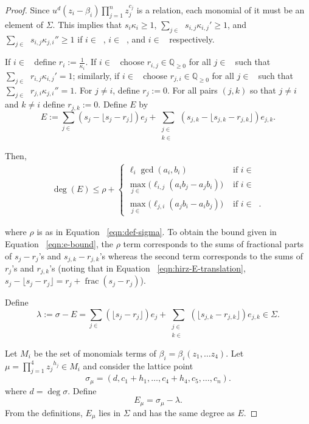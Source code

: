 \documentclass{amsart}
\theoremstyle{plain}
\theoremstyle{definition}
\theoremstyle{remark}
\numberwithin{equation}{section}
\newcommand\bq{{\mathbb Q}}
\newcommand\bida{a}
\newcommand\bidb{b}
\DeclareMathOperator{\fr}{frac}
\DeclareMathOperator{\Te}{T_=}
\DeclareMathOperator{\Tp}{T_+}
\DeclareMathOperator{\Tm}{T_-}
\begin{document}
\begin{proof}
Since $u^d (z_i - \beta_i)\prod_{j=1}^n z_j^{c_j}$ is a relation, each monomial of it must be an element of $\Sigma$. This implies that $s_i\kappa_i\ge 1$, $\sum_{j\in \Tm} s_{i,j}\kappa_{i,j}' \ge 1$, and $\sum_{j\in \Tp} s_{i,j}\kappa_{j,i}'' \ge 1$ if $i\in \Te$, $i\in \Tp$, and $i\in \Tm$ respectively.

If $i\in \Te$ define $r_i := \frac{1}{\kappa_i}$.  If $i\in \Tp$ choose $r_{i,j}\in \bq_{\ge 0}$ for all $j\in \Tm$ such that $\sum_{j\in \Tm} r_{i,j}\kappa_{i,j}' = 1$; similarly, if $i\in \Tm$ choose $r_{j,i}\in \bq_{\ge 0}$ for all $j\in \Tp$ such that $\sum_{j\in \Tm} r_{j,i}\kappa_{j,i}'' = 1$.  For $j\ne i$, define $r_j := 0.$ For all pairs $(j,k)$ so that $j \neq i$ and $k \neq i$ define $r_{j,k} := 0$.
Define $E$ by
\begin{equation}\label{eqn:hirz-E-translation}
	E := \sum_{j\in \Te} (s_j - \lfloor s_j - r_j \rfloor) e_j + \sum_{\substack{j \in 
	\Tp \\ k \in \Tm}} (s_{j,k} - \lfloor s_{j,k} - r_{j,k} \rfloor) e_{j,k}.
\end{equation}

Then,
\begin{align}
\label{eqn:e-bound}
	\deg(E) \le \rho + \begin{cases}
	\ell_i \gcd(\bida_i, \bidb_i)	&\mbox{ if } i \in \Te \\
	\max_{j \in \Tm} \bigl(\ell_{i, j} (\bida_i \bidb_j - \bida_j \bidb_i)\bigr)
	&\mbox{ if } i \in \Tp \\
	\max_{j \in \Tp} \bigl(\ell_{j, i} (\bida_j \bidb_ i - \bida_i \bidb_j) \bigr)
	&\mbox{ if } i \in \Tm. \end{cases}
\end{align}

\noindent
where $\rho$ is as in Equation ~\eqref{eqn:def-sigma}. To obtain the
bound given in Equation ~\eqref{eqn:e-bound}, the $\rho$ term 
corresponds to the sums of fractional parts of $s_j - r_j$'s and $s_
{j, k} - r_{j, k}$'s whereas the second term corresponds to the sums 
of $r_j$'s and $r_{j, k}$'s (noting that in Equation
~\ref{eqn:hirz-E-translation}, $s_j - \lfloor s_j - r_j \rfloor =
r_j + \fr(s_j - r_j)$).

Define
\[
	\lambda := \sigma - E = \sum_{j \in \Te} (\lfloor s_j - r_j \rfloor)
	e_j + \sum_{\substack{j \in \Tp \\ k \in \Tm}} ( \lfloor s_{j, k} -
	r_{j, k} \rfloor) e_{j, k} \in \Sigma.
\]

\noindent
Let $M_i$ be the set of monomials terms of $\beta_i = \beta_i(z_1, \ldots z_4)$.  Let $\mu = \prod_{j=1}^4
{z_j}^{h_j}\in M_i$ and consider the lattice point 
\[
	\sigma_\mu = (d, c_1 + h_1, \ldots, c_4+h_4, c_5, \ldots, c_n).
\]
where $d = \deg \sigma$.
Define 
\[
	E_\mu = \sigma_\mu - \lambda.
\]
From the definitions, $E_\mu$ lies in $\Sigma$ 
and has the same degree as $E$.


\end{proof}
\end{document}
